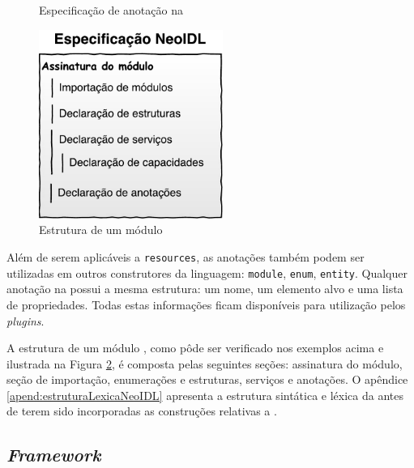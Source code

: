 \vspace{6mm}
 
\begin{figure}[htb]
\begin{small}

\vspace{-.5cm}
\end{small}
\caption{Especificação de anotação na \neoidl{}}
\label{lst:annotationNeoIDL}
\end{figure}

\begin{figure}[htb]
\begin{center}
\includegraphics[width=60mm,trim=0cm 0cm 0cm
0cm]{img/NeoIDLModuleSpecificationPt.pdf}
\end{center}
\caption{Estrutura de um módulo \neoidl{}}
\label{fig:moduloNeoIDL}
\end{figure}

Além de serem aplicáveis a \texttt{resources}, as anotações também podem ser
utilizadas em outros construtores da linguagem: \texttt{module},
\texttt{enum}, \texttt{entity}. Qualquer anotação na \neoidl{} possui a mesma estrutura: um
nome, um elemento alvo e uma lista de propriedades. Todas estas informações
ficam disponíveis para utilização pelos \textit{plugins}.


A estrutura de um módulo \neoidl{}, como pôde ser verificado nos exemplos
acima e ilustrada na Figura \ref{fig:moduloNeoIDL}, é composta pelas seguintes
seções: assinatura do módulo, seção de importação, enumerações e estruturas,
serviços e anotações. O apêndice \ref{apend:estruturaLexicaNeoIDL} apresenta a
estrutura sintática e léxica da \neoidl{} antes de terem sido incorporadas as construções
relativas a \designbycontract{}.



\subsection{\textit{Framework}}
\label{frameNeoIDL}
\vspace{-6mm}


